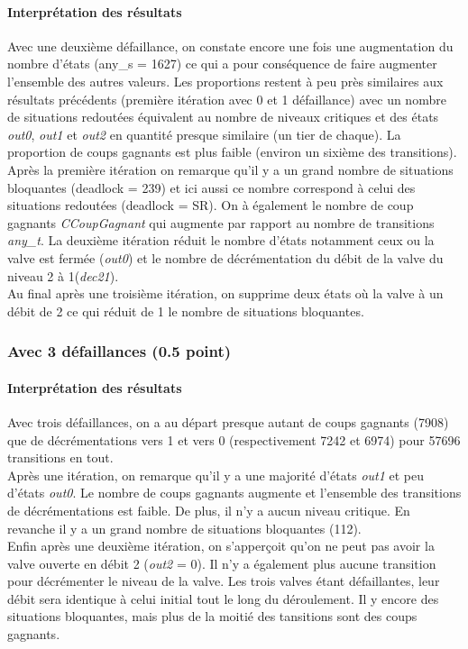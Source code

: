 \documentclass[a4paper]{book}
\begin{document}
\paragraph{Interprétation des résultats}
Avec une deuxième défaillance, on constate encore une fois une augmentation du nombre d'états (any\_s = 1627) ce qui a pour conséquence de faire augmenter l'ensemble 
des autres valeurs. Les proportions restent à peu près similaires aux résultats précédents (première itération avec 0 et 1 défaillance) avec un nombre de situations 
redoutées équivalent au nombre de niveaux critiques et des états  \textit{out0},  \textit{out1} et  \textit{out2} en quantité presque similaire (un tier de chaque). La proportion de coups gagnants est plus faible (environ un sixième des 
transitions). \\
Après la première itération on remarque qu'il y a un grand nombre de situations bloquantes (deadlock = 239) et ici aussi ce nombre correspond à celui des 
situations redoutées (deadlock = SR). On à également le nombre de coup gagnants \textit{CCoupGagnant} qui augmente par rapport au nombre de transitions \textit{any\_t}. 
La deuxième itération réduit le nombre d'états notamment ceux ou la valve est fermée (\textit{out0}) et le nombre de décrémentation du débit de la valve du niveau 2 à 
1(\textit{dec21}). \\
Au final après une troisième itération, on supprime deux états où la valve à un débit de 2 ce qui réduit de 1 le nombre de situations bloquantes.

\subsubsection{Avec 3 défaillances (0.5 point)}




%
\paragraph{Interprétation des résultats}
Avec trois défaillances, on a au départ presque autant de coups gagnants (7908) que de décrémentations vers 1 et vers 0 (respectivement 7242 et 6974) pour 57696 transitions en tout.\\
Après une itération, on remarque qu'il y a une majorité d'états \textit{out1} et peu d'états \textit{out0}. Le nombre de coups gagnants augmente et l'ensemble des transitions 
de décrémentations est faible. De plus, il n'y a aucun niveau critique. En revanche il y a un grand nombre de situations bloquantes (112). \\
Enfin après une deuxième itération, on s'apperçoit qu'on ne peut pas avoir la valve ouverte en débit 2 (\textit{out2} = 0). Il n'y a également plus aucune transition pour 
décrémenter le niveau de la valve. Les trois valves étant défaillantes, leur débit sera identique à celui initial tout le long du déroulement. Il y encore des situations 
bloquantes, mais plus de la moitié des tansitions sont des coups gagnants.
\end{document}
